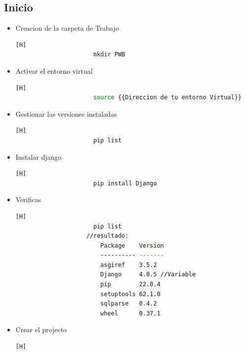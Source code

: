 \documentclass{article}
\begin{document}
\begin{itemize}
    \subsection{Inicio}
    \begin{itemize}
        \item Creacion de la carpeta de Trabajo
        \begin{lstlisting}[language=bash,caption={Entorno de Linux-Ejecute el script de activación para activar el entorno virtual:}][H]
    		          mkdir PWB
    	\end{lstlisting}
        \item Activar el entorno virtual
        \begin{lstlisting}[language=bash,caption={Entorno de Linux-Ejecute el script de activación para activar el entorno virtual:}][H]
    		          source {{Direccion de tu entorno Virtual}}
    	\end{lstlisting}
         \item Gestionar las versiones instaladas
        \begin{lstlisting}[language=bash,caption={Entorno de Linux-Ejecute el script de activación para activar el entorno virtual:}][H]
    		          pip list
    	\end{lstlisting}
        \item Instalar django
        \begin{lstlisting}[language=bash,caption={Entorno de Linux-Ejecute el script de activación para activar el entorno virtual:}][H]
    		          pip install Django
    	\end{lstlisting}
        \item Verificas
        \begin{lstlisting}[language=bash,caption={Entorno de Linux-Ejecute el script de activación para activar el entorno virtual:}][H]
    		          pip list
                    //resultado:
                        Package    Version
                        ---------- -------
                        asgiref    3.5.2
                        Django     4.0.5 //Variable
                        pip        22.0.4
                        setuptools 62.1.0
                        sqlparse   0.4.2
                        wheel      0.37.1
    	\end{lstlisting}
        \item Crear el projecto
        \begin{lstlisting}[language=bash,caption={Entorno de Linux-Ejecute el script de activación para activar el entorno virtual:}][H]

\end{lstlisting}
\end{itemize}
\end{itemize}
\end{document}
